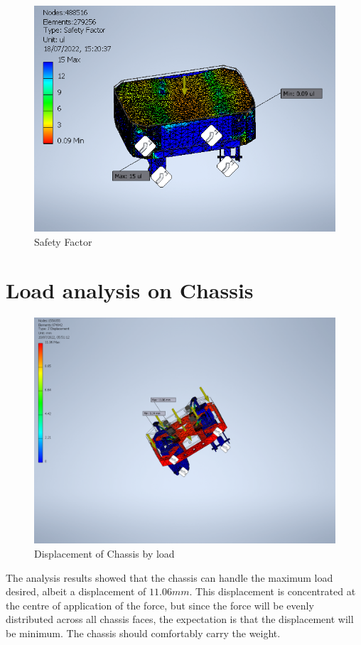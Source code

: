 \begin{figure}[H]
    \centering
    \includegraphics[scale = 0.9]{Figures/safety_factor.png}
    \caption{Safety Factor}
    \label{fig:safetyfactor}
\end{figure}

\section{Load analysis on Chassis}

\begin{figure}[H]
    \centering
    \includegraphics[scale = 0.4]{Figures/ChassisDisplacement.png}
    \caption{Displacement of Chassis by load}
    \label{fig:chassisdisplacement}
\end{figure}
\par
The analysis results showed that the chassis can handle the maximum load desired, albeit a displacement of $11.06mm$. This displacement is concentrated at the centre of application of the force, but since the force will be evenly distributed across all chassis faces, the expectation is that the displacement will be minimum. The chassis should comfortably carry the weight.

